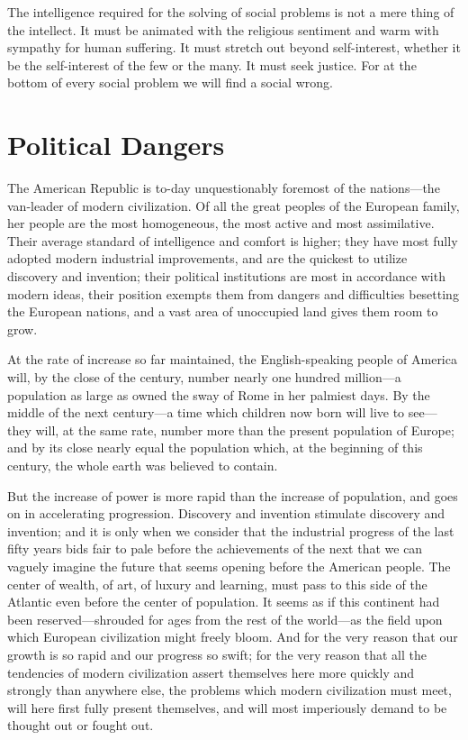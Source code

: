 \documentclass{book}
\begin{document}
The intelligence required for the solving of social problems is not a mere thing of the intellect. It must be animated with the religious sentiment and warm with sympathy for human suffering. It must stretch out beyond self-interest, whether it be the self-interest of the few or the many. It must seek justice. For at the bottom of every social problem we will find a social wrong.

\chapter{Political Dangers}
\label{chapter-2}
The American Republic is to-day unquestionably foremost of the nations—the van-leader of modern civilization. Of all the great peoples of the European family, her people are the most homogeneous, the most active and most assimilative. Their average standard of intelligence and comfort is higher; they have most fully adopted modern industrial improvements, and are the quickest to utilize discovery and invention; their political institutions are most in accordance with modern ideas, their position exempts them from dangers and difficulties besetting the European nations, and a vast area of unoccupied land gives them room to grow.

At the rate of increase so far maintained, the English-speaking people of America will, by the close of the century, number nearly one hundred million—a population as large as owned the sway of Rome in her palmiest days. By the middle of the next century—a time which children now born will live to see—they will, at the same rate, number more than the present population of Europe; and by its close nearly equal the population which, at the beginning of this century, the whole earth was believed to contain.

But the increase of power is more rapid than the increase of population, and goes on in accelerating progression. Discovery and invention stimulate discovery and invention; and it is only when we consider that the industrial progress of the last fifty years bids fair to pale before the achievements of the next that we can vaguely imagine the future that seems opening before the American people. The center of wealth, of art, of luxury and learning, must pass to this side of the Atlantic even before the center of population. It seems as if this continent had been reserved—shrouded for ages from the rest of the world—as the field upon which European civilization might freely bloom. And for the very reason that our growth is so rapid and our progress so swift; for the very reason that all the tendencies of modern civilization assert themselves here more quickly and strongly than anywhere else, the problems which modern civilization must meet, will here first fully present themselves, and will most imperiously demand to be thought out or fought out.
\end{document}
